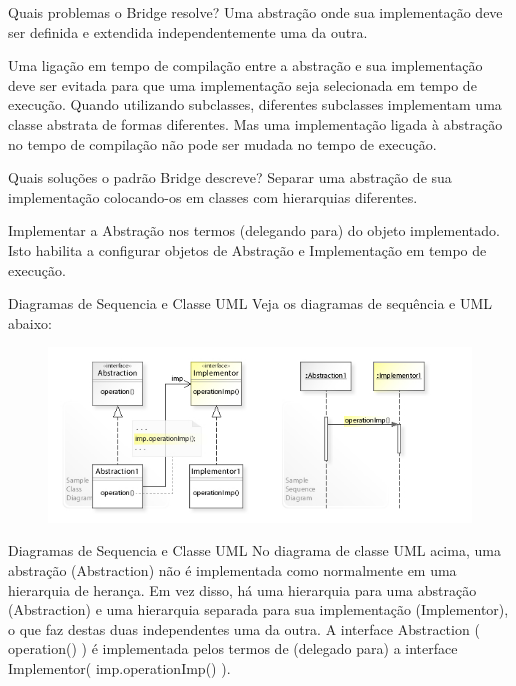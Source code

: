 \documentclass{beamer}
\begin{document}
  \begin{frame}{Quais problemas o Bridge resolve?}
Uma abstração onde sua implementação deve ser definida e extendida independentemente uma da outra.

Uma ligação em tempo de compilação entre a abstração e sua implementação deve ser evitada para que uma implementação seja selecionada em tempo de execução. Quando utilizando subclasses, diferentes subclasses implementam uma classe abstrata de formas diferentes. Mas uma implementação ligada à abstração no tempo de compilação não pode ser mudada no tempo de execução.
  \end{frame}

  \begin{frame}{Quais soluções o padrão Bridge descreve?}
Separar uma abstração de sua implementação colocando-os em classes com hierarquias diferentes.

Implementar a Abstração nos termos (delegando para) do objeto implementado. Isto habilita a configurar objetos de Abstração e Implementação em tempo de execução.
  \end{frame}

  \begin{frame}{Diagramas de Sequencia e Classe UML}
Veja os diagramas de sequência e UML abaixo:

    \begin{figure}
        \includegraphics[scale=0.6]{bridge-uml.jpg}
    \end{figure}
  \end{frame}

  \begin{frame}{Diagramas de Sequencia e Classe UML}
No diagrama de classe UML acima, uma abstração (Abstraction) não é implementada como normalmente em uma hierarquia de herança. Em vez disso, há uma hierarquia para uma abstração (Abstraction) e uma hierarquia separada para sua implementação (Implementor), o que faz destas duas independentes uma da outra. A interface Abstraction ( operation() ) é implementada pelos termos de (delegado para) a interface Implementor( imp.operationImp() ).
  \end{frame}
\end{document}
